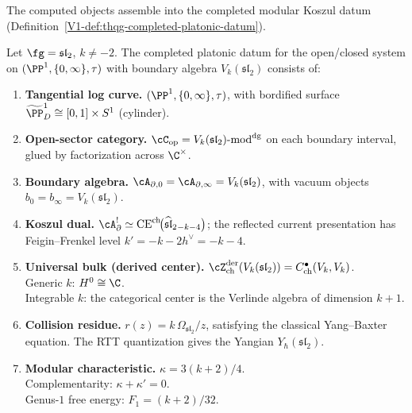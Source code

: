The computed objects assemble into the completed
modular Koszul datum
(Definition~\ref*{V1-def:thqg-completed-platonic-datum}).

\begin{theorem}
\label{thm:benchmark-global-package}
Let $\fg = \mathfrak{sl}_2$, $k \ne -2$. The completed platonic
datum for the open/closed system on
$(\PP^1, \{0,\infty\}, \tau)$ with boundary algebra
$V_k(\mathfrak{sl}_2)$ consists of:
\begin{enumerate}[label=\textup{(\roman*)},nosep]
\item \textbf{Tangential log curve.}
 $(\PP^1, \{0,\infty\}, \tau)$, with bordified surface
 $\widetilde{\PP}^1_D \cong [0,1] \times S^1$
 \textup{(}cylinder\textup{)}.

\item \textbf{Open-sector category.}
 $\cC_{\mathrm{op}} = V_k(\mathfrak{sl}_2)\text{-mod}^{\mathrm{dg}}$
 on each boundary interval, glued by factorization across
 $\C^\times$.

\item \textbf{Boundary algebra.}
 $\cA_{\partial,0} = \cA_{\partial,\infty} = V_k(\mathfrak{sl}_2)$,
 with vacuum objects $b_0 = b_\infty = V_k(\mathfrak{sl}_2)$.

\item \textbf{Koszul dual.}
 $\cA_\partial^!\simeq
 \operatorname{CE}^{\mathrm{ch}}\!\bigl(
 \widehat{\mathfrak{sl}}_2{}_{-k-4}\bigr)$; the reflected current
 presentation has Feigin--Frenkel level
 $k' = -k - 2h^\vee = -k-4$.

\item \textbf{Universal bulk \textup{(}derived center\textup{)}.}
 $\cZ^{\mathrm{der}}_{\mathrm{ch}}(V_k(\mathfrak{sl}_2))
 = C^\bullet_{\mathrm{ch}}(V_k, V_k)$. \\
 Generic $k$: $H^0 \cong \C$.\\
 Integrable $k$: the categorical center is the Verlinde algebra
 of dimension $k + 1$.

\item \textbf{Collision residue.}
 $r(z) = k\,\Omega_{\mathfrak{sl}_2}/z$,
 satisfying the classical Yang--Baxter equation.
 The RTT quantization gives the Yangian
 $Y_\hbar(\mathfrak{sl}_2)$.

\item \textbf{Modular characteristic.}
 $\kappa = 3(k+2)/4$. \\
 Complementarity: $\kappa + \kappa' = 0$.\\
 Genus-$1$ free energy: $F_1 = (k+2)/32$.


\end{enumerate}
\end{theorem}
